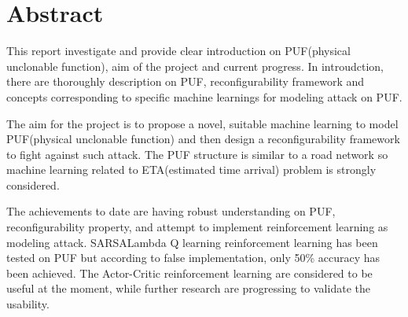 \chapter*{\Large \center Abstract}
\setlength{\parskip}{\baselineskip}%
\setlength{\parindent}{0pt}%

This report investigate and provide clear introduction on PUF(physical unclonable function), aim of the project and current progress.
In introudction, there are thoroughly description on PUF, reconfigurability framework and concepts corresponding to specific machine learnings for modeling attack on PUF.
\par

The aim for the project is to propose a novel, suitable machine learning to model PUF(physical unclonable function)
and then design a reconfigurability framework to fight against such attack. The PUF structure is similar to a road network so 
machine learning related to ETA(estimated time arrival) problem is strongly considered.
\par

The achievements to date are having robust understanding on PUF, reconfigurability property, and attempt to implement reinforcement learning as modeling attack. 
SARSALambda Q learning reinforcement learning has been tested on PUF but according to false implementation, only 50\% accuracy has been achieved.
The Actor-Critic reinforcement learning are considered to be useful at the moment, while further research are progressing to validate the usability.

